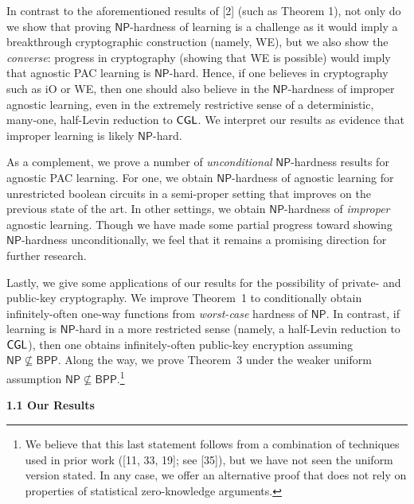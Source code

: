 \documentclass[10pt,a4paper]{article}
\begin{document}
In contrast to the aforementioned results of [2] (such as Theorem 1), not only do we show that proving ${\mathsf{NP}}$-hardness of learning is a challenge as it would imply a breakthrough cryptographic construction (namely, WE), but we also show the \emph{converse}: progress in cryptography (showing that WE is possible) would imply that agnostic PAC learning is ${\mathsf{NP}}$-hard. Hence, if one believes in cryptography such as iO or WE, then one should also believe in the ${\mathsf{NP}}$-hardness of improper agnostic learning, even in the extremely restrictive sense of a deterministic, many-one, half-Levin reduction to ${\sf CGL}$. We interpret our results as evidence that improper learning is likely ${\mathsf{NP}}$-hard.\par




As a complement, we prove a number of \emph{unconditional} ${\mathsf{NP}}$-hardness results for agnostic PAC learning. For one, we obtain ${\mathsf{NP}}$-hardness of agnostic learning for unrestricted boolean circuits in a semi-proper setting that improves on the previous state of the art. In other settings, we obtain ${\mathsf{NP}}$-hardness of \emph{improper} agnostic learning. Though we have made some partial progress toward showing ${\mathsf{NP}}$-hardness unconditionally, we feel that it remains a promising direction for further research.\par




Lastly, we give some applications of our results for the possibility of private- and public-key cryptography. We improve Theorem 1 to conditionally obtain infinitely-often one-way functions from \emph{worst-case} hardness of ${\mathsf{NP}}$. In contrast, if learning is ${\mathsf{NP}}$-hard in a more restricted sense (namely, a half-Levin reduction to ${\sf CGL}$), then one obtains infinitely-often public-key encryption assuming ${\mathsf{NP}}\nsubseteq{\mathsf{BPP}}$. Along the way, we prove Theorem 3 under the weaker uniform assumption ${\mathsf{NP}}\nsubseteq{\mathsf{BPP}}$.\footnote{We believe that this last statement follows from a combination of techniques used in prior work ([11, 33, 19]; see [35]), but we have not seen the uniform version stated. In any case, we offer an alternative proof that does not rely on properties of statistical zero-knowledge arguments.}\par





\par\medskip\noindent\textbf{
1.1 Our Results}\par
\end{document}
